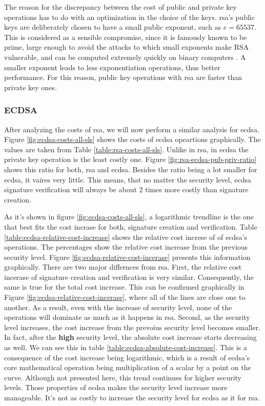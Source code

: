 \documentclass{llncs}
\begin{document}
The reason for the discrepancy between the cost of public and private key operations has to do with an optimization
in the choice of the keys. \gls{rsa}'s public keys are deliberately chosen to have a small public exponent, such as $e=65537$. This is considered as a
sensible compromise, since it is famously known to be prime, large enough to avoid the attacks to which 
small exponents make RSA vulnerable, and can be computed extremely quickly on binary computers \cite{boneh2002fast}\cite{muir2006seifert}.
A smaller exponent leads to less exponentiation operations, thus better performance. For this reason, public
key operations with \gls{rsa} are faster than private key ones.

\subsubsection{ECDSA}

After analyzing the costs of \gls{rsa}, we will now perform a similar analysis for \gls{ecdsa}. Figure \ref{fig:ecdsa-costs-all-sls}
shows the costs of \gls{ecdsa} opeartions graphically. The values are taken from Table \ref{table:rsa-costs-all-sls}. Unlike in \gls{rsa}, 
in \gls{ecdsa} the private key operation is the least costly one. Figure \ref{fig:rsa-ecdsa-pub-priv-ratio} shows this ratio for both, 
\gls{rsa} and \gls{ecdsa}. Besides the ratio being a lot smaller for \gls{ecdsa}, it vaires very little. This means, that no matter
the security level, \gls{ecdsa} signature verification will always be about $2$ times more costly than signature creation.

As it's shown in figure \ref{fig:ecdsa-costs-all-sls}, a logarithmic trendline is the one that best fits the cost incrase for both, 
signature creation and verification.
Table \ref{table:ecdsa-relative-cost-increase} shows the relative cost increse of of \gls{ecdsa}'s operations. The percentages 
show the relative cost increase from the previous security level. Figure \ref{fig:ecdsa-relative-cost-incerase} presents this information
graphically. There are two major differnces from \gls{rsa}. First, the relative cost incerase 
of signature creation and verification is very similar. Consequently, the same is true for the total cost increase. This can be confirmed
graphically in Figure \ref{fig:ecdsa-relative-cost-incerase}, where all of the lines are 
close one to another. As a result, even with the increase of security level, none of the operations will dominate as much as it happens
in \gls{rsa}. Second, as the security level increases, the cost increase from the prevoius security level becomes smaller. In fact, after the
\textbf{high} security level, the absolute cost increase starts decreasing as well. We can see this in table \ref{table:ecdsa-absolute-cost-increase}.
This is a consequence of the cost increase being logarithmic, which is a result of \gls{ecdsa}'s core mathematical operation being
multiplication of a scalar by a point on the curve. Although not presented here, this trend continues for higher security levels. 
Those properties of \gls{ecdsa} makes the security level increase more manageable. It's not as costly to increase the security level for 
\gls{ecdsa} as it for \gls{rsa}.
\end{document}
